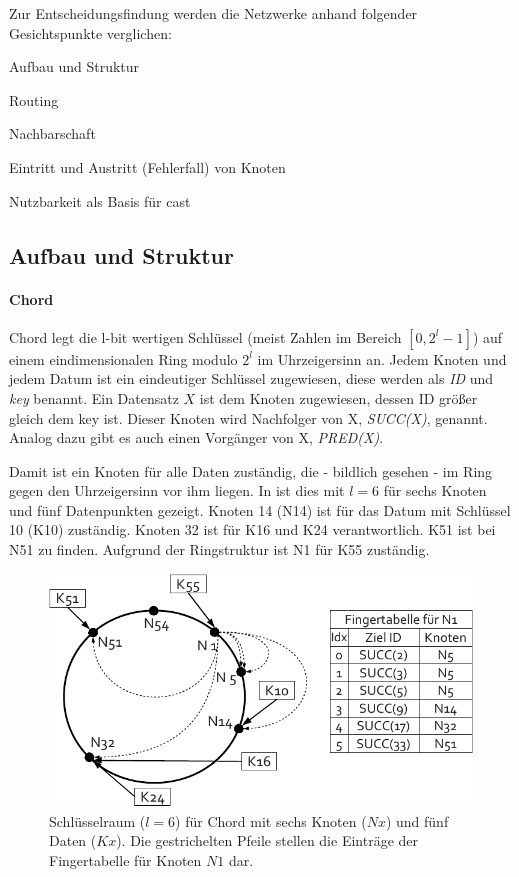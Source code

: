 Zur Entscheidungsfindung werden die Netzwerke anhand folgender Gesichtspunkte verglichen:
\begin{itemize*}
\item Aufbau und Struktur
\item Routing
\item Nachbarschaft
\item Eintritt und Austritt (Fehlerfall) von Knoten
\item Nutzbarkeit als Basis für \ac{cast}
\end{itemize*}

\subsection*{Aufbau und Struktur}
\paragraph{Chord}
Chord \cite{Stoica2003} legt die l-bit wertigen Schlüssel (meist Zahlen im Bereich $[0,2^l-1]$) auf einem eindimensionalen Ring modulo $2^l$ im Uhrzeigersinn an. Jedem Knoten und jedem Datum ist ein eindeutiger Schlüssel zugewiesen, diese werden als \emph{ID} und \emph{key} benannt. Ein Datensatz $X$ ist dem Knoten zugewiesen, dessen ID größer gleich dem key ist. Dieser Knoten wird Nachfolger von X, \emph{SUCC(X)}, genannt. Analog dazu gibt es auch einen Vorgänger von X, \emph{PRED(X)}.

Damit ist ein Knoten für alle Daten zuständig, die - bildlich gesehen - im Ring gegen den Uhrzeigersinn vor ihm liegen. In  ist dies mit $l=6$ für sechs Knoten und fünf Datenpunkten gezeigt. Knoten 14 (N14) ist für das Datum mit Schlüssel 10 (K10) zuständig. Knoten 32 ist für K16 und K24 verantwortlich. K51 ist bei N51 zu finden. Aufgrund der Ringstruktur ist N1 für K55 zuständig.

\begin{figure}[htbp]
\centering
\includegraphics{grafics/chord_key_space.pdf}
\caption{Schlüsselraum ($l=6$) für Chord mit sechs Knoten ($Nx$) und fünf Daten ($Kx$). Die gestrichelten Pfeile stellen die Einträge der Fingertabelle für Knoten $N1$ dar.}
\label{fig:chord_key_space}
\end{figure}


